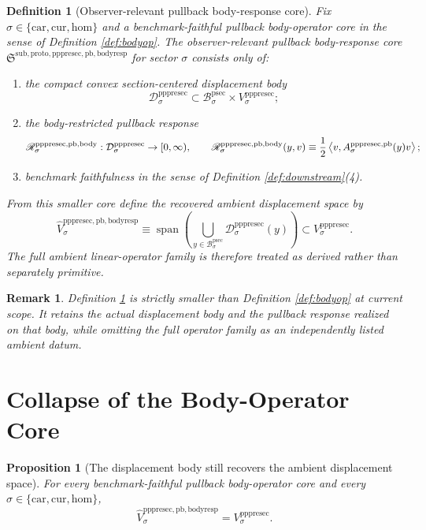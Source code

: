 \documentclass[11pt]{article}
\newcommand{\Car}{\mathrm{car}}
\newcommand{\Cur}{\mathrm{cur}}
\newcommand{\Hom}{\mathrm{hom}}
\newcommand{\ProtoSectionBody}[1]{\mathcal B_{#1}^{\mathrm{psec}}}
\newcommand{\PrePreProtoSectionVertical}[1]{V_{#1}^{\mathrm{pppresec}}}
\newcommand{\PrePreProtoSectionResidualBody}[1]{\mathcal D_{#1}^{\mathrm{pppresec}}}
\newcommand{\PrePreProtoSectionPullbackOperator}[1]{A_{#1}^{\mathrm{pppresec,pb}}}
\newcommand{\PrePreProtoSectionBodyResponse}[1]{\mathscr R_{#1}^{\mathrm{pppresec,pb,body}}}
\newcommand{\PullbackBodyResponseCore}{\mathfrak S^{\mathrm{sub,proto,pppresec,pb,bodyresp}}}
\newcommand{\RecoveredBodyResponseSpace}[1]{\widehat V_{#1}^{\mathrm{pppresec,pb,bodyresp}}}
\newtheorem{definition}{Definition}
\newtheorem{proposition}{Proposition}
\newtheorem{remark}{Remark}
\begin{document}
\begin{definition}[Observer-relevant pullback body-response core]
\label{def:bodyresp}
Fix \(\sigma\in\{\Car,\Cur,\Hom\}\) and a benchmark-faithful pullback body-operator core in the sense of Definition \ref{def:bodyop}. The \emph{observer-relevant pullback body-response core} \(\PullbackBodyResponseCore\) for sector \(\sigma\) consists only of:
\begin{enumerate}
    \item the compact convex section-centered displacement body
    \[
    \PrePreProtoSectionResidualBody{\sigma}
    \subset
    \ProtoSectionBody{\sigma}\times\PrePreProtoSectionVertical{\sigma};
    \]
    \item the body-restricted pullback response
    \[
    \PrePreProtoSectionBodyResponse{\sigma}:
    \PrePreProtoSectionResidualBody{\sigma}\to [0,\infty),
    \qquad
    \PrePreProtoSectionBodyResponse{\sigma}(y,v)
    \equiv
    \frac{1}{2}
    \ev{v,\PrePreProtoSectionPullbackOperator{\sigma}(y)v};
    \]
    \item benchmark faithfulness in the sense of Definition \ref{def:downstream}(4).
\end{enumerate}
From this smaller core define the recovered ambient displacement space by
\[
\RecoveredBodyResponseSpace{\sigma}
\equiv
\operatorname{span}\left(
\bigcup_{y\in\ProtoSectionBody{\sigma}}
\PrePreProtoSectionResidualBody{\sigma}(y)
\right)
\subset
\PrePreProtoSectionVertical{\sigma}.
\]
The full ambient linear-operator family is therefore treated as derived rather than separately primitive.
\end{definition}

\begin{remark}
Definition \ref{def:bodyresp} is strictly smaller than Definition \ref{def:bodyop} at current scope. It retains the actual displacement body and the pullback response realized on that body, while omitting the full operator family as an independently listed ambient datum.
\end{remark}

\section{Collapse of the Body-Operator Core}

\begin{proposition}[The displacement body still recovers the ambient displacement space]
\label{prop:recover_space}
For every benchmark-faithful pullback body-operator core and every \(\sigma\in\{\Car,\Cur,\Hom\}\),
\[
\RecoveredBodyResponseSpace{\sigma}
=
\PrePreProtoSectionVertical{\sigma}.
\]
\end{proposition}
\end{document}
